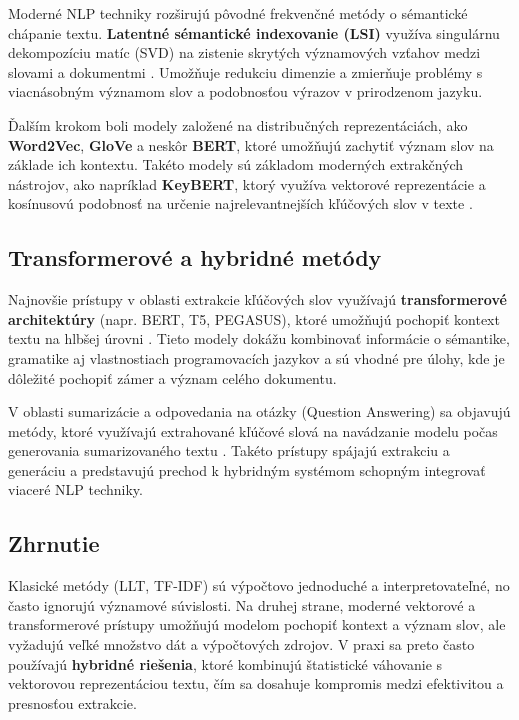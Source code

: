 \documentclass[a4paper,12pt]{article}
\begin{document}
Moderné NLP techniky rozširujú pôvodné frekvenčné metódy o sémantické chápanie textu. \textbf{Latentné sémantické indexovanie (LSI)} využíva singulárnu dekompozíciu matíc (SVD) na zistenie skrytých významových vzťahov medzi slovami a dokumentmi \cite{deerwester1990indexing}. Umožňuje redukciu dimenzie a zmierňuje problémy s viacnásobným významom slov a podobnosťou výrazov v prirodzenom jazyku.

Ďalším krokom boli modely založené na distribučných reprezentáciách, ako \textbf{Word2Vec}, \textbf{GloVe} a neskôr \textbf{BERT}, ktoré umožňujú zachytiť význam slov na základe ich kontextu. Takéto modely sú základom moderných extrakčných nástrojov, ako napríklad \textbf{KeyBERT}, ktorý využíva vektorové reprezentácie a kosínusovú podobnosť na určenie najrelevantnejších kľúčových slov v texte \cite{grootendorst2020keybert}.

\subsection{Transformerové a hybridné metódy}

Najnovšie prístupy v oblasti extrakcie kľúčových slov využívajú \textbf{transformerové architektúry} (napr. BERT, T5, PEGASUS), ktoré umožňujú pochopiť kontext textu na hlbšej úrovni \cite{devlin2019bert, lewis2020bart, zhang2020pegasus}. Tieto modely dokážu kombinovať informácie o sémantike, gramatike aj vlastnostiach programovacích jazykov a sú vhodné pre úlohy, kde je dôležité pochopiť zámer a význam celého dokumentu.

V oblasti sumarizácie a odpovedania na otázky (Question Answering) sa objavujú metódy, ktoré využívajú extrahované kľúčové slová na navádzanie modelu počas generovania sumarizovaného textu \cite{grootendorst2020keybert}. Takéto prístupy spájajú extrakciu a generáciu a predstavujú prechod k hybridným systémom schopným integrovať viaceré NLP techniky.

\subsection{Zhrnutie}

Klasické metódy (LLT, TF-IDF) sú výpočtovo jednoduché a interpretovateľné, no často ignorujú významové súvislosti. Na druhej strane, moderné vektorové a transformerové prístupy umožňujú modelom pochopiť kontext a význam slov, ale vyžadujú veľké množstvo dát a výpočtových zdrojov. V praxi sa preto často používajú \textbf{hybridné riešenia}, ktoré kombinujú štatistické váhovanie s vektorovou reprezentáciou textu, čím sa dosahuje kompromis medzi efektivitou a presnosťou extrakcie.
\end{document}
